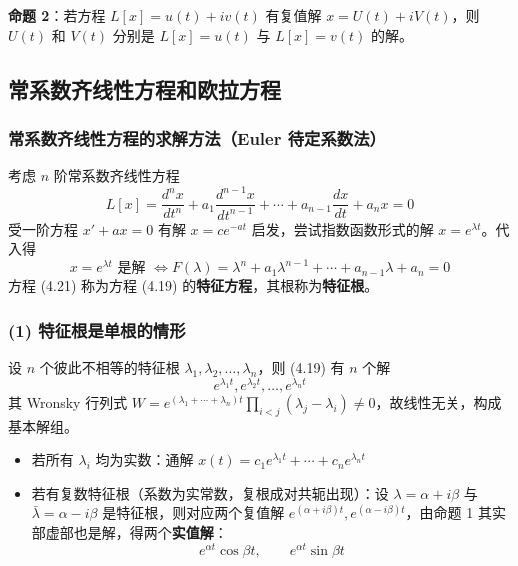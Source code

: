 \textbf{命题 2}：若方程 $L[x] = u(t) + iv(t)$ 有复值解 $x = U(t) + iV(t)$，则 $U(t)$ 和 $V(t)$ 分别是 $L[x] = u(t)$ 与 $L[x] = v(t)$ 的解。

\subsection{常系数齐线性方程和欧拉方程}

\subsubsection{常系数齐线性方程的求解方法（Euler 待定系数法）}

考虑 $n$ 阶常系数齐线性方程
\begin{equation}L[x] = \frac{d^n x}{dt^n} + a_1\frac{d^{n-1}x}{dt^{n-1}} + \cdots + a_{n-1}\frac{dx}{dt} + a_n x = 0 \tag{4.19}\end{equation}
受一阶方程 $x' + ax = 0$ 有解 $x = ce^{-at}$ 启发，尝试指数函数形式的解 $x = e^{\lambda t}$。代入得
\begin{equation}x = e^{\lambda t} \text{ 是解 } \iff F(\lambda) = \lambda^n + a_1\lambda^{n-1} + \cdots + a_{n-1}\lambda + a_n = 0 \tag{4.21}\end{equation}
方程 (4.21) 称为方程 (4.19) 的\textbf{特征方程}，其根称为\textbf{特征根}。

\subsubsection{(1) 特征根是单根的情形}

设 $n$ 个彼此不相等的特征根 $\lambda_1, \lambda_2, \ldots, \lambda_n$，则 (4.19) 有 $n$ 个解
\begin{equation}e^{\lambda_1 t}, e^{\lambda_2 t}, \ldots, e^{\lambda_n t} \tag{4.22}\end{equation}
其 Wronsky 行列式 $W = e^{(\lambda_1+\cdots+\lambda_n)t}\prod_{i<j}(\lambda_j - \lambda_i) \neq 0$，故线性无关，构成基本解组。

\begin{itemize}
    \item 若所有 $\lambda_i$ 均为实数：通解 $x(t) = c_1e^{\lambda_1 t} + \cdots + c_ne^{\lambda_n t}$
    \item 若有复数特征根（系数为实常数，复根成对共轭出现）：设 $\lambda = \alpha + i\beta$ 与 $\bar{\lambda} = \alpha - i\beta$ 是特征根，则对应两个复值解 $e^{(\alpha+i\beta)t}, e^{(\alpha-i\beta)t}$，由命题 1 其实部虚部也是解，得两个\textbf{实值解}：
    $$e^{\alpha t}\cos\beta t, \qquad e^{\alpha t}\sin\beta t$$
\end{itemize}

